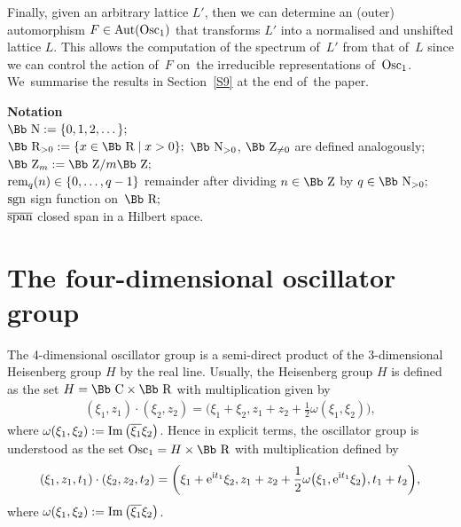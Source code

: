 \documentclass[10pt,a4paper]{amsart}
\newcommand\CC{{\mbox{\Bb C}}}
\newcommand\RR{{\mbox{\Bb R}}}
\newcommand\NN{{\mbox{\Bb N}}}
\newcommand\ZZ{{\mbox{\Bb Z}}}
\newcommand{\Aut}{\mathop{{\rm Aut}}}
\newcommand{\Osc}{{\rm Osc}}
\newcommand{\sgn}{\mathop{{\rm sgn}}}
\renewcommand{\Im}{\mathop{{\rm Im}}}
\newcommand{\rem}{\mathop{{\rm rem}}}
\newcommand{\cSpan}{{\overline{\rm span}}}
\numberwithin{equation}{section}
\begin{document}
Finally, given an arbitrary lattice $L'$, then we can determine an (outer) automorphism $F\in\Aut(\Osc_1)$ that transforms $L'$ into a normalised and unshifted lattice $L$. This allows the computation of the spectrum of~$L'$ from that of~$L$ since we can control the action of~$F$ on~the irre\-ducible representations of~$\Osc_1$. We~summarise the results in Section~\ref{S9} at the end of~the paper.

\medskip

\noindent\textbf{Notation} \\[1ex]
$\NN:=\{0,1,2,\dots\};$\\[.5ex]
$\RR_{>0}:=\{x\in\RR\mid x>0\};$ $\NN_{>0}$, $\ZZ_{\not=0}$ are defined analogously; \\[.5ex]
$\ZZ_m:=\ZZ/{m\ZZ};$\\[.5ex]
$\rem_q(n)\in\{0,\dots,q-1\}$ \quad remainder after dividing $n\in\ZZ$ by $q\in\NN_{>0};$\\[.5ex]
$\sgn$ \quad sign function on~$\RR;$\\[.5ex]
$\cSpan$ \quad closed span in a Hilbert space.


\section{The four-dimensional oscillator group}
The 4-dimensional oscillator group is a semi-direct product of the 3-dimensional Heisenberg group $H$ by the real line. Usually, the Heisenberg group $H$ is defined as the set $H=\CC\times\RR$ with multiplication given by
\begin{gather*}
(\xi_1,z_1)\cdot(\xi_2,z_2)=\bigg(\xi_1+\xi_2,z_1+z_2+{\frac12}\omega(\xi_1,\xi_2)\bigg),
\end{gather*}
where $\omega(\xi_1,\xi_2):=\Im\big(\overline{\xi_1}\xi_2\big)$. Hence in explicit terms, the oscillator group is understood as the set $\Osc_1=H\times\RR$ with multiplication defined by
\begin{gather*}
(\xi_1,z_1,t_1)\cdot(\xi_2,z_2,t_2)=\bigg(\xi_1+{\rm e}^{{\rm i}t_1}\xi_2,z_1+z_2+{\frac12}\omega\big(\xi_1,{\rm e}^{{\rm i}t_1}\xi_2\big),t_1+t_2\bigg),
\end{gather*}
where $\omega(\xi_1,\xi_2):=\Im\big(\overline{\xi_1}\xi_2\big)$.
\end{document}
